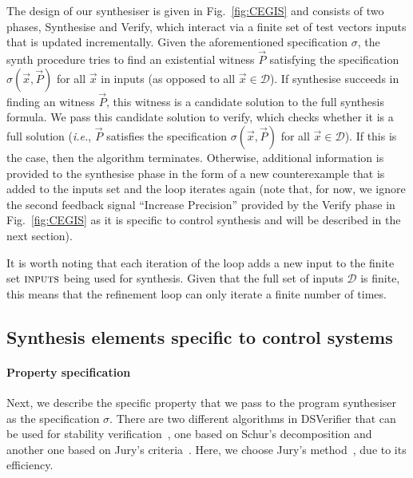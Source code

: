 \documentclass{sig-alternate-05-2015}
\newcommand{\blue}[1]{{\color{blue}#1}}
\begin{document}
The design of our synthesiser is given in Fig.~\ref{fig:CEGIS} and consists
of two phases, {\sc Synthesise} and {\sc Verify}, which interact via a
finite set of test vectors {\sc inputs} that is updated incrementally. 
Given the aforementioned specification $\sigma$, the {\sc synth} procedure
tries to find an existential witness $\vec{P}$ satisfying the specification
$\sigma(\vec{x}, \vec{P})$ for all $\vec{x}$ in {\sc inputs} (as opposed to
all $\vec{x} \in \mathcal{D}$).
%
If {\sc synthesise} succeeds in finding an witness $\vec{P}$, this witness
is a candidate solution to the full synthesis formula.  We pass this
candidate solution to {\sc verify}, which checks whether it is a full
solution ({\it i.e.}, $\vec{P}$ satisfies the specification $\sigma(\vec{x},
\vec{P})$ for all $\vec{x}\in\mathcal{D}$).
%
%
%
If this is the case, then the algorithm terminates.  Otherwise, additional
information is provided to the {\sc synthesise} phase in the form of a new
counterexample that is added to the {\sc inputs} set and the loop iterates
again (note that, for now, we ignore the second feedback signal ``Increase
Precision'' provided by the {\sc Verify} phase in Fig.~\ref{fig:CEGIS} as it
is specific to control synthesis and will be described in the next section).


It is
worth noting that each iteration of the loop adds a new input to the
finite set $\text{\sc inputs}$ being used for synthesis.  Given that
the full set of inputs $\mathcal{D}$
is finite, this means that the refinement loop
can only iterate a finite number of times.

\subsection{Synthesis elements specific to control systems}
\label{synthesis-elements}

\paragraph{Property specification}
Next, we describe the specific property that we pass to the program
synthesiser as the specification $\sigma$.  There are two different
algorithms in DSVerifier that can be used for stability
verification~\cite{daes20161,Bessa16}, one based on
Schur's decomposition and another one based on Jury's
criteria~\cite{astrom1997computer}.  Here, we choose Jury's
method~\cite{astrom1997computer}, due to its efficiency.
\end{document}
